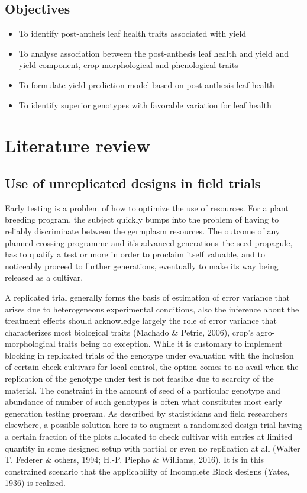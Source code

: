 \documentclass[12pt,oneside]{dukestatscithesis} %
\providecommand{\tightlist}{%
  \setlength{\itemsep}{0pt}\setlength{\parskip}{0pt}}
\theoremstyle{definition}
\theoremstyle{definition}
\theoremstyle{definition}
\theoremstyle{remark}
\begin{document}
\section{Objectives}\label{objectives}
\begin{itemize}
\tightlist
\item
  To identify post-antheis leaf health traits associated with yield
\item
  To analyse association between the post-anthesis leaf health and yield
  and yield component, crop morphological and phenological traits
\item
  To formulate yield prediction model based on post-anthesis leaf health
\item
  To identify superior genotypes with favorable variation for leaf
  health
\end{itemize}
\chapter{Literature review}\label{literature-review}

\section{Use of unreplicated designs in field
trials}\label{unrep-designs}

Early testing is a problem of how to optimize the use of resources. For
a plant breeding program, the subject quickly bumps into the problem of
having to reliably discriminate between the germplasm resources. The
outcome of any planned crossing programme and it's advanced
generations--the seed propagule, has to qualify a test or more in order
to proclaim itself valuable, and to noticeably proceed to further
generations, eventually to make its way being released as a cultivar.

A replicated trial generally forms the basis of estimation of error
variance that arises due to heterogeneous experimental conditions, also
the inference about the treatment effects should acknowledge largely the
role of error variance that characterizes most biological traits
(Machado \& Petrie, 2006), crop's agro-morphological traits being no
exception. While it is customary to implement blocking in replicated
trials of the genotype under evaluation with the inclusion of certain
check cultivars for local control, the option comes to no avail when the
replication of the genotype under test is not feasible due to scarcity
of the material. The constraint in the amount of seed of a particular
genotype and abundance of number of such genotypes is often what
constitutes most early generation testing program. As described by
statisticians and field researchers elsewhere, a possible solution here
is to augment a randomized design trial having a certain fraction of the
plots allocated to check cultivar with entries at limited quantity in
some designed setup with partial or even no replication at all (Walter
T. Federer \& others, 1994; H.-P. Piepho \& Williams, 2016). It is in
this constrained scenario that the applicability of Incomplete Block
designs (Yates, 1936) is realized.
\end{document}
